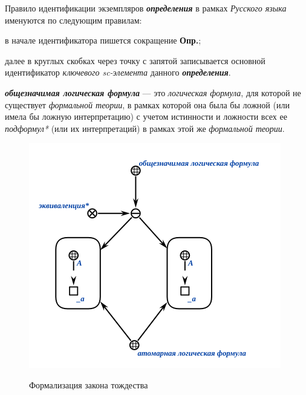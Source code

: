 Правило идентификации экземпляров \textbf{\textit{определения}} в рамках \textit{Русского языка} именуются по следующим правилам:
\begin{textitemize}
	\item{в начале идентификатора пишется сокращение \textbf{Опр.};}
	\item{далее в круглых скобках через точку с запятой записывается основной идентификатор  \textit{ключевого sc-элемента\scnrolesign} данного \textbf{\textit{определения}}.}
\end{textitemize}


\begin{SCn}
\end{SCn}
\textbf{\textit{общезначимая логическая формула}} --- это \textit{логическая формула}, для которой не существует \textit{формальной теории}, в рамках которой она была бы ложной (или имела бы ложную интерпретацию) с учетом истинности и ложности всех ее \textit{подформул*} (или их интерпретаций) в рамках этой же \textit{формальной теории}.

\begin{figure}[H]
\caption{Формализация закона тождества}
\includegraphics[scale=0.8]{author/part2/figures/logic/valid_formula.png}
\label{fig:valid_formula}
\end{figure}


